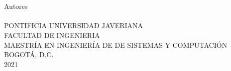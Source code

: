 \thispagestyle{empty}


\begin{center}
		\vspace*{2cm}
		\fontsize{16pt}{16pt}\textbf{\CODIGOTG\ }\\
		\fontsize{14pt}{14pt}\selectfont \TITULOTG\ \\ %
		\vspace*{5cm}
		\fontsize{14pt}{14pt}\selectfont Autores\\
		\AUTORESTG\ \\
		\vspace*{5cm}
		\fontsize{14pt}{14pt}\selectfont PONTIFICIA UNIVERSIDAD JAVERIANA\\
		FACULTAD DE INGENIERIA\\
		MAESTRÍA EN INGENIERÍA DE DE SISTEMAS Y COMPUTACIÓN\\
		BOGOTÁ, D.C.\\
		2021 %


\end{center}
\hline


